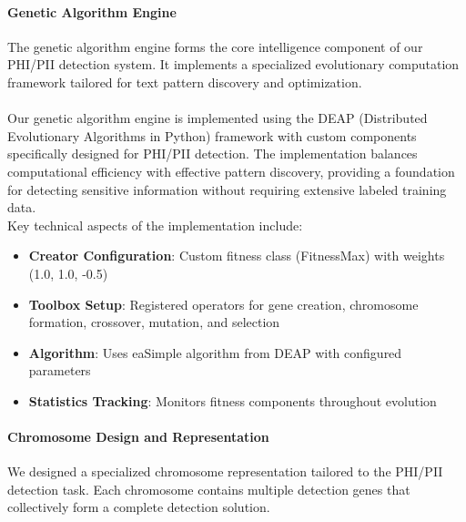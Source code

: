 \documentclass[conference]{IEEEtran}
\begin{document}
\paragraph{\textbf{Genetic Algorithm Engine}}
The genetic algorithm engine forms the core intelligence component of our PHI/PII detection system. It implements a specialized evolutionary computation framework tailored for text pattern discovery and optimization.
\\
\\
Our genetic algorithm engine is implemented using the DEAP (Distributed Evolutionary Algorithms in Python) framework with custom components specifically designed for PHI/PII detection. The implementation balances computational efficiency with effective pattern discovery, providing a foundation for detecting sensitive information without requiring extensive labeled training data.
\\
Key technical aspects of the implementation include:
\begin{itemize}
\item \textbf{Creator Configuration}: Custom fitness class (FitnessMax) with weights (1.0, 1.0, -0.5)
\item \textbf{Toolbox Setup}: Registered operators for gene creation, chromosome formation, crossover, mutation, and selection
\item \textbf{Algorithm}: Uses eaSimple algorithm from DEAP with configured parameters
\item \textbf{Statistics Tracking}: Monitors fitness components throughout evolution
\end{itemize}

\paragraph{\textbf{Chromosome Design and Representation}}
We designed a specialized chromosome representation tailored to the PHI/PII detection task. Each chromosome contains multiple detection genes that collectively form a complete detection solution.
\end{document}
